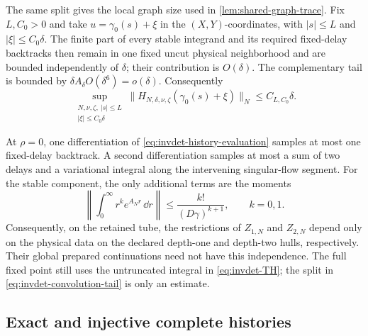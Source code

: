 The same split gives the local graph size used in
\cref{lem:shared-graph-trace}.  Fix \(L,C_0>0\) and take
\(u=\gamma_0(s)+\xi\) in the \((X,Y)\)-coordinates, with
\(|s|\le L\) and \(|\xi|\le C_0\delta\).  The finite part of every stable
integrand and its required fixed-delay backtracks then remain in one fixed
uncut physical neighborhood and are bounded independently of \(\delta\);
their contribution is \(O(\delta)\).  The complementary tail is bounded by
\(\delta A_\delta O(\delta^6)=o(\delta)\).  Consequently
\begin{equation}
 \sup_{\substack{N,\nu,\zeta,\ |s|\le L\\|\xi|\le C_0\delta}}
 \|H_{N,\delta,\nu,\zeta}(\gamma_0(s)+\xi)\|_N
 \leq C_{L,C_0}\delta.                               \label{eq:invdet-fixed-compact-size}
\end{equation}

At \(\rho=0\), one differentiation of
\cref{eq:invdet-history-evaluation} samples at most one fixed-delay
backtrack.  A second differentiation samples at most a sum of two delays
and a variational integral along the intervening singular-flow segment.
For the stable component, the only additional terms are the moments
\begin{equation}
 \left\|\int_0^\infty r^ke^{A_Nr}\,\dd r\right\|
 \leq\frac{k!}{(D\gamma)^{k+1}},
 \qquad k=0,1.                                      \label{eq:invdet-semigroup-moments}
\end{equation}
Consequently, on the retained tube, the restrictions of \(Z_{1,N}\) and
\(Z_{2,N}\) depend only on the physical data on the declared depth-one and
depth-two hulls, respectively.  Their global prepared continuations need not
have this independence.  The full fixed point still uses the untruncated integral in
\cref{eq:invdet-TH}; the split in
\cref{eq:invdet-convolution-tail} is only an estimate.

\subsection{Exact and injective complete histories}

